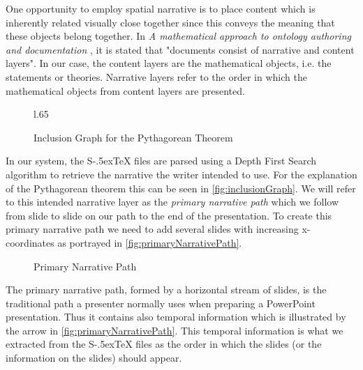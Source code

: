 \documentclass{llncs}
\def\stex{\texorpdfstring{\raisebox{-.5ex}S\kern-.5ex\TeX}{sTeX}\xspace}
\begin{document}
One opportunity to employ spatial narrative is to place content which is inherently related visually close together since this conveys the meaning that these objects belong together. In \textit{A mathematical approach to ontology authoring and documentation} \cite{LK:MathOntoAuthDoc09}, it is stated that "documents consist of narrative and content layers". In our case, the content layers are the mathematical objects, i.e. the statements or theories. Narrative layers refer to the order in which the mathematical objects from content layers are presented.

\begin{figure}l{.65\textwidth}\vspace{-2em}
  \caption{Inclusion Graph for the Pythagorean Theorem}\label{fig:inclusionGraph}
\end{figure}

In our system, the \stex files are parsed using a Depth First Search algorithm to retrieve the narrative the writer intended to use. For the explanation of the Pytha\-go\-rean theorem this can be seen in \autoref{fig:inclusionGraph}. We will refer to this intended narrative layer as the \textit{primary narrative path} which we follow from slide to slide on our path to the end of the presentation. To create this primary narrative path we need to add several slides with increasing x-coordinates as portrayed in \autoref{fig:primaryNarrativePath}.

\begin{figure}[ht]\centering
  \vspace{-.5em}
  \caption{Primary Narrative Path}\label{fig:primaryNarrativePath}
  \vspace{-1em}
\end{figure}

The primary narrative path, formed by a horizontal stream of slides, is the traditional
path a presenter normally uses when preparing a PowerPoint presentation. Thus it contains
also temporal information which is illustrated by the arrow in
\autoref{fig:primaryNarrativePath}. This temporal information is what we extracted from
the \stex files as the order in which the slides (or the information on the slides) should
appear.
\end{document}

